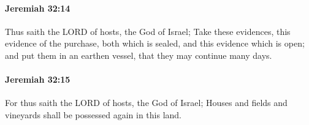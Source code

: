 		\paragraph{Jeremiah 32:14} %
			\label{JEREMIAH-32-14}

			Thus saith the LORD of hosts, the God of Israel; Take these evidences, this evidence of the purchase, both which is sealed, and this evidence which is open; and put them in an earthen vessel, that they may continue many days.


		\paragraph{Jeremiah 32:15} %
			\label{JEREMIAH-32-15}

			For thus saith the LORD of hosts, the God of Israel; Houses and fields and vineyards shall be possessed again in this land.


